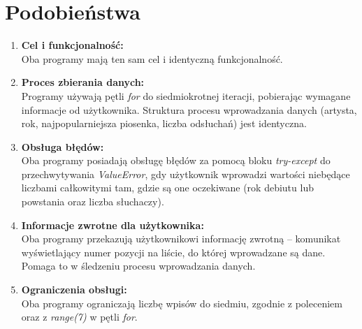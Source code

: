 \documentclass{article}
\begin{document}
\section{Podobieństwa}
\begin{enumerate}
    \item \textbf{Cel i funkcjonalność:}\\Oba programy mają ten sam cel i identyczną funkcjonalność.
    \item \textbf{Proces zbierania danych:}\\Programy używają pętli \textit{for} do siedmiokrotnej iteracji, pobierając wymagane informacje od użytkownika. Struktura procesu wprowadzania danych (artysta, rok, najpopularniejsza piosenka, liczba odsłuchań) jest identyczna.
    \item \textbf{Obsługa błędów:}\\Oba programy posiadają obsługę błędów za pomocą bloku \textit{try-except} do przechwytywania \textit{ValueError}, gdy użytkownik wprowadzi wartości niebędące liczbami całkowitymi tam, gdzie są one oczekiwane (rok debiutu lub powstania oraz liczba słuchaczy).
    \item \textbf{Informacje zwrotne dla użytkownika:}\\Oba programy przekazują użytkownikowi informację zwrotną – komunikat wyświetlający numer pozycji na liście, do której wprowadzane są dane. Pomaga to w śledzeniu procesu wprowadzania danych.
    \item \textbf{Ograniczenia obsługi:}\\Oba programy ograniczają liczbę wpisów do siedmiu, zgodnie z poleceniem oraz z \textit{range(7)} w pętli \textit{for}.
\end{enumerate}
\end{document}
